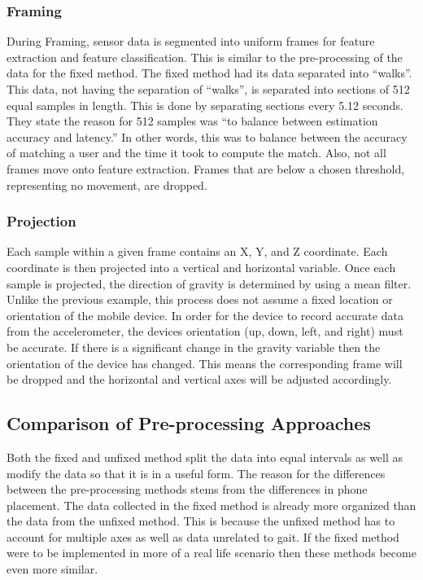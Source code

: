 \documentclass{sig-alternate}
\begin{document}
		
\subsubsection{Framing}{
 During Framing, sensor data is segmented into uniform frames for feature extraction and feature classification. This is similar to the pre-processing of the data for the fixed method. The fixed method had its data separated into ``walks''. This data, not having the separation of ``walks'', is separated into sections of 512 equal samples in length. This is done by separating sections every 5.12 seconds. They state the reason for 512 samples was ``to balance between estimation accuracy and latency.'' In other words, this was to balance between the accuracy of matching a user and the time it took to compute the match. Also, not all frames move onto feature extraction. Frames that are below a chosen threshold, representing no movement, are dropped. }
\subsubsection{Projection}{
	Each sample within a given frame contains an X, Y, and Z coordinate. Each coordinate is then projected into a vertical and horizontal variable. Once each sample is projected, the direction of gravity is determined by using a mean filter. Unlike the previous example, this process does not assume a fixed location or orientation of the mobile device. In order for the device to record accurate data from the accelerometer, the devices orientation (up, down, left, and right) must be accurate. If there is a significant change in the gravity variable then the orientation of the device has changed. This means the corresponding frame will be dropped and the horizontal and vertical axes will be adjusted accordingly. 
}
\subsection{Comparison of Pre-processing Approaches}
	Both the fixed and unfixed method split the data into equal intervals as well as modify the data so that it is in a useful form. The reason for the differences between the pre-processing methods stems from the differences in phone placement. The data collected in the fixed method is already more organized than the data from the unfixed method. This is because the unfixed method has to account for multiple axes as well as data unrelated to gait. If the fixed method were to be implemented in more of a real life scenario then these methods become even more similar. 
\end{document}
